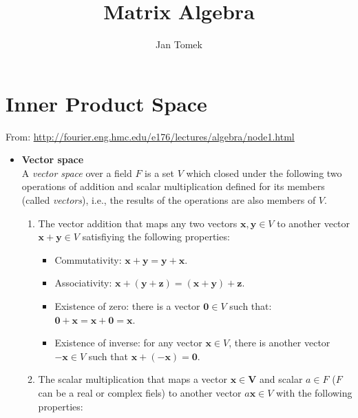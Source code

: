 \documentclass[10pt,b5paper,titlepage]{book}
\author{Jan Tomek}
\title{Matrix Algebra}
\begin{document}
\maketitle

\tableofcontents

\chapter{Inner Product Space}

From: \url{http://fourier.eng.hmc.edu/e176/lectures/algebra/node1.html}\\

\begin{itemize}
    \item \textbf{Vector space}\\

        A \textit{vector space} over a field $F$ is a set $V$ which closed under
        the following two operations of addition and scalar multiplication
        defined for its members (called \textit{vectors}), i.e., the results
        of the operations are also members of $V$.

        \begin{enumerate}
            \item The vector addition that maps any two vectors
                $\mathbf{x}, \mathbf{y} \in V$ to another vector
                $\mathbf{x} + \mathbf{y} \in V$ satisfiying the following
                properties:
                \begin{itemize}
                    \item Commutativity: $\mathbf{x} + \mathbf{y} = \mathbf{y} + \mathbf{x}$.
                    \item Associativity: $\mathbf{x} + (\mathbf{y} + \mathbf{z}) = (\mathbf{x} + \mathbf{y}) + \mathbf{z}$.
                    \item Existence of zero: there is a vector $\mathbf{0} \in V$ such that: $\mathbf{0} + \mathbf{x} = \mathbf{x} + \mathbf{0} = \mathbf{x}$.
                    \item Existence of inverse: for any vector $\mathbf{x} \in V$,
                        there is another vector $-\mathbf{x} \in V$ such that $\mathbf{x} + (- \mathbf{x}) = \mathbf{0}$.
                \end{itemize}
            \item The scalar multiplication that maps a vector $\mathbf{x \in V}$
                and scalar $a \in F$ ($F$ can be a real or complex fiels) to another
                vector $a \mathbf{x} \in V$ with the following properties:


\end{enumerate}
\end{itemize}
\end{document}
